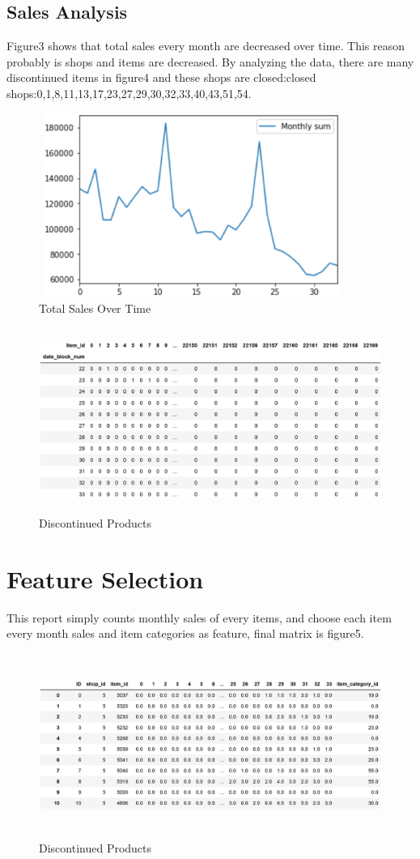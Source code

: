 \subsection{Sales Analysis}	Figure3 shows that total sales every month are decreased over time. This reason probably is shops and items are decreased. By analyzing the data, there are many discontinued items in figure4 and these shops are closed:closed shops:0,1,8,11,13,17,23,27,29,30,32,33,40,43,51,54.
	\begin{figure}[htb]
	\centering
	\includegraphics[width=10cm, height=6cm]{figures/sum.eps}
	\caption{Total Sales Over Time
	}\label{straddltimeScale}
\end{figure}
\begin{figure}[htb]
	\centering
	\includegraphics[width=12cm, height=6cm]{figures/stopitems.eps}
	\caption{Discontinued Products
	}\label{straddltimeScale}
\end{figure}
\section{Feature Selection} \label{sec-method}	
This report simply counts monthly sales of every items, and choose each item every month sales and item categories as feature, final matrix is figure5.
\begin{figure}[htb]
	\centering
	\includegraphics[width=12cm, height=6cm]{figures/feature1.eps}
	\caption{Discontinued Products
	}\label{straddltimeScale}
\end{figure}
